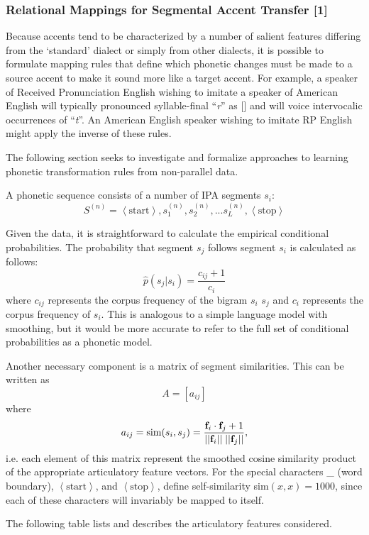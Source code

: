 \subsubsection{Relational Mappings for Segmental Accent Transfer [1]}
Because accents tend to be characterized by a number of salient features differing
from the `standard' dialect or simply from other dialects, it is possible to formulate
mapping rules that define which phonetic changes must be made to a source accent to make it sound
more like a target accent. For example, a speaker of Received Pronunciation English wishing 
to imitate a speaker of American English will typically pronounced syllable-final ``\textit{r}'' 
as [] and will voice intervocalic occurrences of ``\textit{t}''. An American English 
speaker wishing to imitate RP English might apply the inverse of these rules. 

The following section seeks to investigate and formalize approaches to learning 
phonetic transformation rules from non-parallel data.

A phonetic sequence consists of a number of IPA segments $s_i$:
$$S^{(n)} = \left<\textrm{start}\right>, s^{(n)}_1, s^{(n)}_2, ... s^{(n)}_{L}, \left<\textrm{stop}\right>$$

Given the data, it is straightforward to calculate the empirical conditional probabilities. The probability 
that segment $s_j$ follows segment $s_i$ is calculated as follows:
$$\hat{p}(s_j | s_i) = \frac{c_{ij}+1}{c_i}$$
where $c_{ij}$ represents the corpus frequency of the bigram $s_i$ $s_j$ and $c_i$ represents the corpus 
frequency of $s_i$. This is analogous to a simple language model with smoothing, but it would be more accurate 
to refer to the full set of conditional probabilities as a phonetic model. 

Another necessary component is a matrix of segment similarities. This can be written as
$$A = [a_{ij}]$$
where
$$a_{ij} = \textrm{sim}(s_i, s_j) = \frac
{\textbf{f}_i \cdot \textbf{f}_j + 1}
{||\textbf{f}_i|| \hphantom{.} ||\textbf{f}_j||},$$
i.e. each element of this matrix represent the smoothed cosine similarity product of the appropriate 
articulatory feature vectors. 
For the special characters \_ (word boundary), $\left<\textrm{start}\right>$, and $\left<\textrm{stop}\right>$, define self-similarity 
sim$(x, x) = 1000$, since each of these characters will invariably be mapped to itself.


The following table lists and describes the articulatory features considered.


